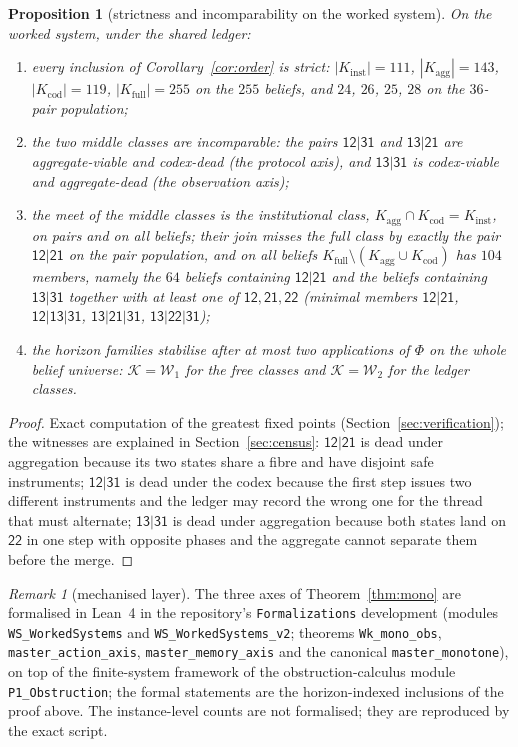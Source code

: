\documentclass[11pt,a4paper]{article}
\theoremstyle{plain}
\newtheorem{proposition}[theorem]{Proposition}
\theoremstyle{definition}
\theoremstyle{remark}
\newtheorem{remark}[theorem]{Remark}
\newcommand{\calK}{\mathcal{K}}
\newcommand{\calW}{\mathcal{W}}
\newcommand{\st}[1]{\mathsf{#1}}
\newcommand{\Kinst}{K_{\mathrm{inst}}}
\newcommand{\Kagg}{K_{\mathrm{agg}}}
\newcommand{\Kcod}{K_{\mathrm{cod}}}
\newcommand{\Kfull}{K_{\mathrm{full}}}
\begin{document}
\begin{proposition}[strictness and incomparability on the worked system]\label{prop:strict}
On the worked system, under the shared ledger:
\begin{enumerate}[label=(\alph*),leftmargin=2em,itemsep=1pt]
\item every inclusion of Corollary~\ref{cor:order} is strict: $|\Kinst|=111$, $|\Kagg|=143$, $|\Kcod|=119$, $|\Kfull|=255$ on the $255$ beliefs, and $24$, $26$, $25$, $28$ on the $36$-pair population;
\item the two middle classes are incomparable: the pairs $\st{12|31}$ and $\st{13|21}$ are aggregate-viable and codex-dead (the protocol axis), and $\st{13|31}$ is codex-viable and aggregate-dead (the observation axis);
\item the meet of the middle classes is the institutional class, $\Kagg\cap\Kcod=\Kinst$, on pairs and on all beliefs; their join misses the full class by exactly the pair $\st{12|21}$ on the pair population, and on all beliefs $\Kfull\setminus(\Kagg\cup\Kcod)$ has $104$ members, namely the $64$ beliefs containing $\st{12|21}$ and the beliefs containing $\st{13|31}$ together with at least one of $\st{12},\st{21},\st{22}$ (minimal members $\st{12|21}$, $\st{12|13|31}$, $\st{13|21|31}$, $\st{13|22|31}$);
\item the horizon families stabilise after at most two applications of $\Phi$ on the whole belief universe: $\calK=\calW_1$ for the free classes and $\calK=\calW_2$ for the ledger classes.
\end{enumerate}
\end{proposition}

\begin{proof}
Exact computation of the greatest fixed points (Section~\ref{sec:verification}); the witnesses are explained in Section~\ref{sec:census}: $\st{12|21}$ is dead under aggregation because its two states share a fibre and have disjoint safe instruments; $\st{12|31}$ is dead under the codex because the first step issues two different instruments and the ledger may record the wrong one for the thread that must alternate; $\st{13|31}$ is dead under aggregation because both states land on $\st{22}$ in one step with opposite phases and the aggregate cannot separate them before the merge.
\end{proof}

\begin{remark}[mechanised layer]\label{rem:lean}
The three axes of Theorem~\ref{thm:mono} are formalised in Lean~4 in the repository's \texttt{Formalizations} development (modules \texttt{WS\_\allowbreak{}WorkedSystems} and \texttt{WS\_\allowbreak{}WorkedSystems\_\allowbreak{}v2}; theorems \texttt{Wk\_\allowbreak{}mono\_\allowbreak{}obs}, \texttt{master\_\allowbreak{}action\_\allowbreak{}axis}, \texttt{master\_\allowbreak{}memory\_\allowbreak{}axis} and the canonical \texttt{master\_\allowbreak{}monotone}), on top of the finite-system framework of the obstruction-calculus module \texttt{P1\_Obstruction}; the formal statements are the horizon-indexed inclusions of the proof above. The instance-level counts are not formalised; they are reproduced by the exact script.
\end{remark}
\end{document}
